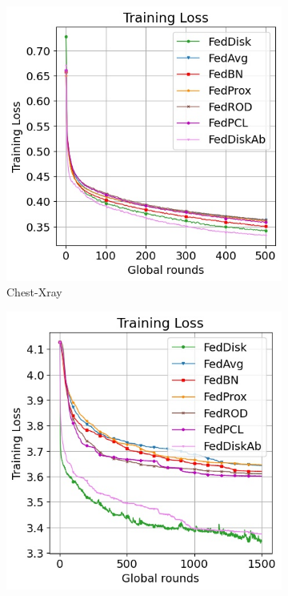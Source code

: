\documentclass[journal]{IEEEtai}
\begin{document}
\begin{figure}[h!]
	\centering
	\begin{subfigure}[]{0.3\linewidth}	
		\includegraphics[width=\linewidth]{Figures/xray/train_loss}
		\caption{Chest-Xray }
	\end{subfigure}
	\hspace{0.01em}%
	\begin{subfigure}{0.3\linewidth}
		\includegraphics[width=\linewidth]{Figures/femnist/train_loss}

\end{subfigure}
\end{figure}
\end{document}
